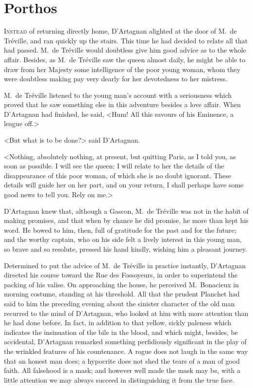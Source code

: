 
\chapter{Porthos}

\lettrine{I}{nstead} of returning directly home, D'Artagnan alighted at the door of M.~de Tréville, and ran quickly up the stairs. This time he had decided to relate all that had passed. M.~de Tréville would doubtless give him good advice as to the whole affair. Besides, as M.~de Tréville saw the queen almost daily, he might be able to draw from her Majesty some intelligence of the poor young woman, whom they were doubtless making pay very dearly for her devotedness to her mistress. 

M.~de Tréville listened to the young man's account with a seriousness which proved that he saw something else in this adventure besides a love affair. When D'Artagnan had finished, he said, <Hum! All this savours of his Eminence, a league off.> 

<But what is to be done?> said D'Artagnan. 

<Nothing, absolutely nothing, at present, but quitting Paris, as I told you, as soon as possible. I will see the queen; I will relate to her the details of the disappearance of this poor woman, of which she is no doubt ignorant. These details will guide her on her part, and on your return, I shall perhaps have some good news to tell you. Rely on me.> 

D'Artagnan knew that, although a Gascon, M.~de Tréville was not in the habit of making promises, and that when by chance he did promise, he more than kept his word. He bowed to him, then, full of gratitude for the past and for the future; and the worthy captain, who on his side felt a lively interest in this young man, so brave and so resolute, pressed his hand kindly, wishing him a pleasant journey. 

Determined to put the advice of M.~de Tréville in practice instantly, D'Artagnan directed his course toward the Rue des Fossoyeurs, in order to superintend the packing of his valise. On approaching the house, he perceived M.~Bonacieux in morning costume, standing at his threshold. All that the prudent Planchet had said to him the preceding evening about the sinister character of the old man recurred to the mind of D'Artagnan, who looked at him with more attention than he had done before. In fact, in addition to that yellow, sickly paleness which indicates the insinuation of the bile in the blood, and which might, besides, be accidental, D'Artagnan remarked something perfidiously significant in the play of the wrinkled features of his countenance. A rogue does not laugh in the same way that an honest man does; a hypocrite does not shed the tears of a man of good faith. All falsehood is a mask; and however well made the mask may be, with a little attention we may always succeed in distinguishing it from the true face. 

